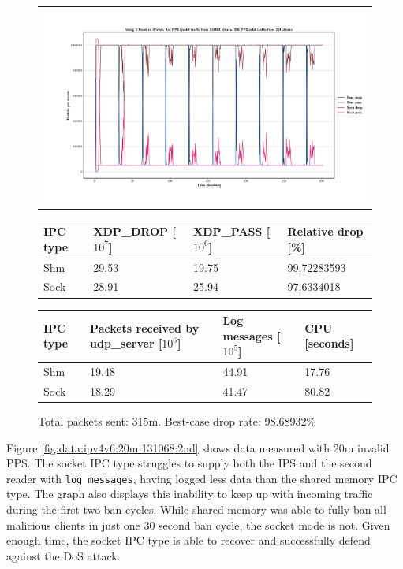 \begin{figure}[!h]
	\centering
	\scriptsize
	\begin{tabular}{c}
    	\centerline{\includegraphics[width=1.2\textwidth]{images/IPv4v6_1m_2ndReader_1.png}}
	\end{tabular}
	\begin{tabular}{llll}
		\toprule
		\textbf{IPC type} & \textbf{XDP\_DROP [$10^7$]} & \textbf{XDP\_PASS [$10^6$]} & \textbf{Relative drop [\%]} \\ \midrule 
		Shm & 29.53 & 19.75 & 99.72283593 \\
        Sock & 28.91 & 25.94 & 97.6334018 \\
	\bottomrule
	\end{tabular}
    \begin{tabular}{llll}
		\toprule
		\textbf{IPC type} & \textbf{Packets received by udp\_server [$10^6$]} & \textbf{Log messages [$10^5$]} & \textbf{CPU [seconds]} \\ \midrule 
		Shm & 19.48 & 44.91 & 17.76 \\
        Sock & 18.29 & 41.47 & 80.82 \\
	\bottomrule
	\end{tabular}
	\caption[Simplefail2ban with 2nd Reader, IPv4v6, 1m \ac{PPS}, 131,068 malicious clients]{Total packets sent: 315m. Best-case drop rate: 98.68932\%}
	\label{fig:data:ipv4v6:1m:131068:2nd}
\end{figure}

Figure \ref{fig:data:ipv4v6:20m:131068:2nd} shows data measured with 20m invalid \ac{PPS}.
The socket \ac{IPC} type struggles to supply both the \ac{IPS} and the second reader with \texttt{log messages}, having logged less data than the shared memory \ac{IPC} type.
The graph also displays this inability to keep up with incoming traffic during the first two ban cycles.
While shared memory was able to fully ban all malicious clients in just one 30 second ban cycle, the socket mode is not.
Given enough time, the socket \ac{IPC} type is able to recover and successfully defend against the \ac{DoS} attack.

